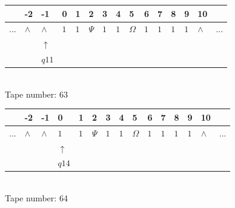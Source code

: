 \documentclass[11pt]{article}
\begin{document}
\begin{table}[H]
\centering
\begin{tabular}{lllllllllllllll}
 & -2 & -1 & 0 & 1 & 2 & 3 & 4 & 5 & 6 & 7 & 8 & 9 & 10 & \\
\hline
$...$ & \multicolumn{1}{|l|}{$\wedge$} & \multicolumn{1}{|l|}{$\wedge$} & \multicolumn{1}{|l|}{$1$} & \multicolumn{1}{|l|}{$1$} & \multicolumn{1}{|l|}{$\Psi$} & \multicolumn{1}{|l|}{$1$} & \multicolumn{1}{|l|}{$1$} & \multicolumn{1}{|l|}{$\Omega$} & \multicolumn{1}{|l|}{$1$} & \multicolumn{1}{|l|}{$1$} & \multicolumn{1}{|l|}{$1$} & \multicolumn{1}{|l|}{$1$} & \multicolumn{1}{|l|}{$\wedge$} & $...$\\
\hline
&  & $\uparrow$ &  &  &  &  &  &  &  &  &  &  &  &  \\
&  & $ q11 $ &  &  &  &  &  &  &  &  &  &  &  &  \\
\end{tabular}
\\
Tape number: 63
\noindent\makebox[\linewidth]{\hdashrule{\textwidth}{1pt}{1pt}}\end{table}

\begin{table}[H]
\centering
\begin{tabular}{lllllllllllllll}
 & -2 & -1 & 0 & 1 & 2 & 3 & 4 & 5 & 6 & 7 & 8 & 9 & 10 & \\
\hline
$...$ & \multicolumn{1}{|l|}{$\wedge$} & \multicolumn{1}{|l|}{$\wedge$} & \multicolumn{1}{|l|}{$1$} & \multicolumn{1}{|l|}{$1$} & \multicolumn{1}{|l|}{$\Psi$} & \multicolumn{1}{|l|}{$1$} & \multicolumn{1}{|l|}{$1$} & \multicolumn{1}{|l|}{$\Omega$} & \multicolumn{1}{|l|}{$1$} & \multicolumn{1}{|l|}{$1$} & \multicolumn{1}{|l|}{$1$} & \multicolumn{1}{|l|}{$1$} & \multicolumn{1}{|l|}{$\wedge$} & $...$\\
\hline
&  &  & $\uparrow$ &  &  &  &  &  &  &  &  &  &  &  \\
&  &  & $ q14 $ &  &  &  &  &  &  &  &  &  &  &  \\
\end{tabular}
\\
Tape number: 64
\noindent\makebox[\linewidth]{\hdashrule{\textwidth}{1pt}{1pt}}\end{table}

\end{document}
